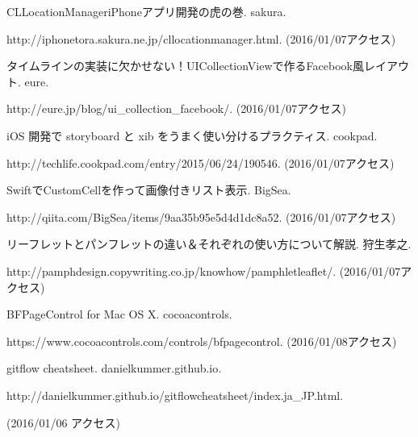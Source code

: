 \documentclass[openany,11pt,papersize]{jsbook}
\begin{document}
\begin{thebibliography}{9}
\bibitem{}
CLLocationManageriPhoneアプリ開発の虎の巻. sakura. \par
http://iphonetora.sakura.ne.jp/cllocationmanager.html. (2016/01/07アクセス)

\bibitem{}
タイムラインの実装に欠かせない！UICollectionViewで作るFacebook風レイアウト. eure. \par
http://eure.jp/blog/ui\_collection\_facebook/. (2016/01/07アクセス)

\bibitem{}
iOS 開発で storyboard と xib をうまく使い分けるプラクティス. cookpad. \par
http://techlife.cookpad.com/entry/2015/06/24/190546. (2016/01/07アクセス)

\bibitem{}
SwiftでCustomCellを作って画像付きリスト表示. BigSea. \par
http://qiita.com/BigSea/items/9aa35b95e5d4d1dc8a52. (2016/01/07アクセス)

\bibitem{}
リーフレットとパンフレットの違い＆それぞれの使い方について解説. 狩生孝之. \par
http://pamphdesign.copywriting.co.jp/knowhow/pamphletleaflet/. (2016/01/07アクセス)

\bibitem{}
BFPageControl for Mac OS X. cocoacontrols. \par
https://www.cocoacontrols.com/controls/bfpagecontrol. (2016/01/08アクセス)

\bibitem{}
gitflow cheatsheet. danielkummer.github.io. \par
http://danielkummer.github.io/gitflowcheatsheet/index.ja\_JP.html. \par
(2016/01/06 アクセス)
\end{thebibliography}
\end{document}
